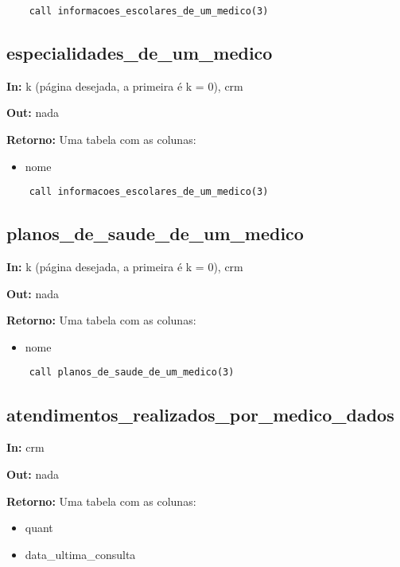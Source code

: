 \begin{verbatim}
	call informacoes_escolares_de_um_medico(3)
\end{verbatim}

\subsection{especialidades\_de\_um\_medico}

\textbf{In:} k (página desejada, a primeira é k = 0), crm

\textbf{Out:} nada

\textbf{Retorno:} Uma tabela com as colunas:

\begin{itemize}
	\item nome
\end{itemize}

\begin{verbatim}
	call informacoes_escolares_de_um_medico(3)
\end{verbatim}

\subsection{planos\_de\_saude\_de\_um\_medico}

\textbf{In:} k (página desejada, a primeira é k = 0), crm

\textbf{Out:} nada

\textbf{Retorno:} Uma tabela com as colunas:

\begin{itemize}
	\item nome
\end{itemize}

\begin{verbatim}
	call planos_de_saude_de_um_medico(3)
\end{verbatim}

\subsection{atendimentos\_realizados\_por\_medico\_dados}

\textbf{In:} crm

\textbf{Out:} nada

\textbf{Retorno:} Uma tabela com as colunas:

\begin{itemize}
	\item quant
	\item data\_ultima\_consulta
\end{itemize}

